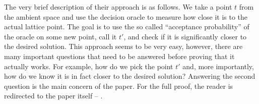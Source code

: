 The very brief description of their approach is as follows. We take a point $t$ from the ambient space and use the decision oracle to measure how close it is to the actual lattice point. The goal is to use the so called ``acceptance probability'' of the oracle on some new point, call it $t'$, and check if it is significantly closer to the desired solution. This approach seems to be very easy, however, there are many important questions that need to be answered before proving that it actually works. For example, how do we pick the point $t'$ and, more importantly, how do we know it is in fact closer to the desired solution? Answering the second question is the main concern of the paper. For the full proof, the reader is redirected to the paper itself -- \cite{oracle}.

